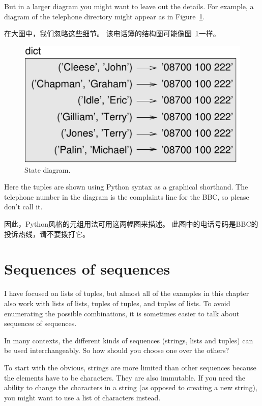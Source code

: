 But in a larger diagram you might want to leave out the
details.  For example, a diagram of the telephone directory might
appear as in Figure~\ref{fig.dict2}.

在大图中，我们忽略这些细节。 该电话簿的结构图可能像图~\ref{fig.dict2}一样。

\begin{figure}
\centerline
{\includegraphics[scale=0.8]{figs/dict2.pdf}}
\caption{State diagram.}
\label{fig.dict2}
\end{figure}

Here the tuples are shown using Python syntax as a graphical
shorthand.  The telephone number in the diagram is the complaints line
for the BBC, so please don't call it.

因此，Python风格的元组用法可用这两幅图来描述。 此图中的电话号码是BBC的投诉热线，请不要拨打它。


\section{Sequences of sequences}

I have focused on lists of tuples, but almost all of the examples in
this chapter also work with lists of lists, tuples of tuples, and
tuples of lists.  To avoid enumerating the possible combinations, it
is sometimes easier to talk about sequences of sequences.

In many contexts, the different kinds of sequences (strings, lists and
tuples) can be used interchangeably.  So how should you choose one
over the others?

To start with the obvious, strings are more limited than other
sequences because the elements have to be characters.  They are
also immutable.  If you need the ability to change the characters
in a string (as opposed to creating a new string), you might
want to use a list of characters instead.

